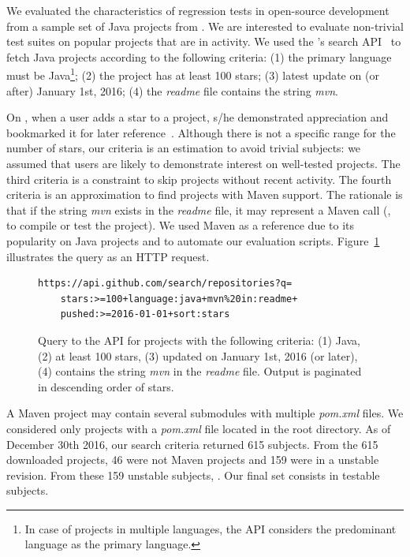 We evaluated the characteristics of regression tests in open-source
development from a sample set of Java projects from \github{}.  We are
interested to evaluate non-trivial test suites on popular projects
that are in activity. We used the \github{}'s search
API~\cite{githubsearch} to fetch Java projects according to the
following criteria: (1) the primary language must be Java\footnote{In
case of projects in multiple languages, the \github{} API considers
the predominant language as the primary language.}; (2) the project
has at least 100 stars; (3) latest update on (or after) January 1st,
2016; (4) the \emph{readme} file contains the string \emph{mvn}.

On \github{}, when a user adds a star to a project, s/he demonstrated
appreciation and bookmarked it for later
reference~\cite{github-stars}.  Although there is not a specific range
for the number of stars, our criteria is an estimation to avoid
trivial subjects: we assumed that \github{} users are likely to
demonstrate interest on well-tested projects. The third criteria is a
constraint to skip projects without recent activity. The fourth
criteria is an approximation to find projects with Maven support. The
rationale is that if the string \emph{mvn} exists in the \emph{readme}
file, it may represent a Maven call (\eg, to compile or test the
project). We used Maven as a reference due to its popularity on Java
projects and to automate our evaluation scripts.
Figure~\ref{fig:subject-query} illustrates the query as an HTTP
request.

\begin{figure}[h!]
\centering
\scriptsize
{}
\begin{lstlisting}
https://api.github.com/search/repositories?q=
    stars:>=100+language:java+mvn%20in:readme+
    pushed:>=2016-01-01+sort:stars

\end{lstlisting}
    \caption{\label{fig:subject-query} Query to the \github{} API for
    projects with the following criteria: (1) Java, (2) at least 100
    stars, (3) updated on January 1st, 2016 (or later), (4) contains
    the string \emph{mvn} in the \emph{readme} file. Output is
    paginated in descending order of stars.}
\end{figure}

A Maven project may contain several submodules with multiple
\emph{pom.xml} files. We considered only projects with a
\emph{pom.xml} file located in the root directory.  As of December
30th 2016, our search criteria returned 615 subjects. From the 615
downloaded projects, 46 were not Maven projects and 159 were in a
unstable revision. From these 159 unstable subjects, . Our final set consists in
\numSubjs{} testable subjects.


